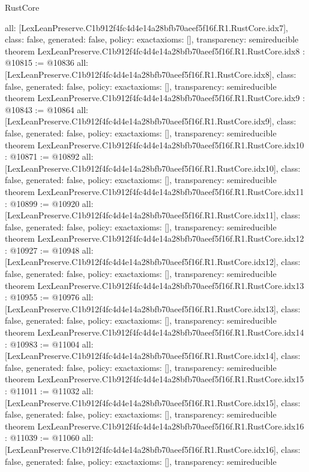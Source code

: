\begin{lexlean}{RustCore}
\begin{coremodule}
{  all: [LexLeanPreserve.C1b912f4fc4d4e14a28bfb70aeef5f16f.R1.RustCore.idx7],
  class: false,
  generated: false,
  policy: exact{axioms: []},
  transparency: semireducible
}
theorem LexLeanPreserve.C1b912f4fc4d4e14a28bfb70aeef5f16f.R1.RustCore.idx8 : @10815 := @10836 {
  all: [LexLeanPreserve.C1b912f4fc4d4e14a28bfb70aeef5f16f.R1.RustCore.idx8],
  class: false,
  generated: false,
  policy: exact{axioms: []},
  transparency: semireducible
}
theorem LexLeanPreserve.C1b912f4fc4d4e14a28bfb70aeef5f16f.R1.RustCore.idx9 : @10843 := @10864 {
  all: [LexLeanPreserve.C1b912f4fc4d4e14a28bfb70aeef5f16f.R1.RustCore.idx9],
  class: false,
  generated: false,
  policy: exact{axioms: []},
  transparency: semireducible
}
theorem LexLeanPreserve.C1b912f4fc4d4e14a28bfb70aeef5f16f.R1.RustCore.idx10 : @10871 := @10892 {
  all: [LexLeanPreserve.C1b912f4fc4d4e14a28bfb70aeef5f16f.R1.RustCore.idx10],
  class: false,
  generated: false,
  policy: exact{axioms: []},
  transparency: semireducible
}
theorem LexLeanPreserve.C1b912f4fc4d4e14a28bfb70aeef5f16f.R1.RustCore.idx11 : @10899 := @10920 {
  all: [LexLeanPreserve.C1b912f4fc4d4e14a28bfb70aeef5f16f.R1.RustCore.idx11],
  class: false,
  generated: false,
  policy: exact{axioms: []},
  transparency: semireducible
}
theorem LexLeanPreserve.C1b912f4fc4d4e14a28bfb70aeef5f16f.R1.RustCore.idx12 : @10927 := @10948 {
  all: [LexLeanPreserve.C1b912f4fc4d4e14a28bfb70aeef5f16f.R1.RustCore.idx12],
  class: false,
  generated: false,
  policy: exact{axioms: []},
  transparency: semireducible
}
theorem LexLeanPreserve.C1b912f4fc4d4e14a28bfb70aeef5f16f.R1.RustCore.idx13 : @10955 := @10976 {
  all: [LexLeanPreserve.C1b912f4fc4d4e14a28bfb70aeef5f16f.R1.RustCore.idx13],
  class: false,
  generated: false,
  policy: exact{axioms: []},
  transparency: semireducible
}
theorem LexLeanPreserve.C1b912f4fc4d4e14a28bfb70aeef5f16f.R1.RustCore.idx14 : @10983 := @11004 {
  all: [LexLeanPreserve.C1b912f4fc4d4e14a28bfb70aeef5f16f.R1.RustCore.idx14],
  class: false,
  generated: false,
  policy: exact{axioms: []},
  transparency: semireducible
}
theorem LexLeanPreserve.C1b912f4fc4d4e14a28bfb70aeef5f16f.R1.RustCore.idx15 : @11011 := @11032 {
  all: [LexLeanPreserve.C1b912f4fc4d4e14a28bfb70aeef5f16f.R1.RustCore.idx15],
  class: false,
  generated: false,
  policy: exact{axioms: []},
  transparency: semireducible
}
theorem LexLeanPreserve.C1b912f4fc4d4e14a28bfb70aeef5f16f.R1.RustCore.idx16 : @11039 := @11060 {
  all: [LexLeanPreserve.C1b912f4fc4d4e14a28bfb70aeef5f16f.R1.RustCore.idx16],
  class: false,
  generated: false,
  policy: exact{axioms: []},
  transparency: semireducible
}
\end{coremodule}
\end{lexlean}
